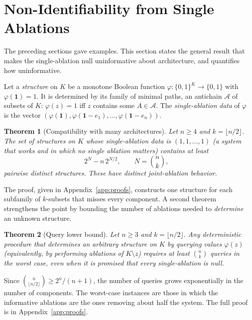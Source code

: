 \documentclass[11pt]{article}
\newtheorem{theorem}{Theorem}[section]
\theoremstyle{definition}
\theoremstyle{remark}
\begin{document}
\section{Non-Identifiability from Single Ablations}\label{sec:ident}

The preceding sections gave examples. This section states the general result that makes the single-ablation null uninformative about architecture, and quantifies how uninformative.

Let a \emph{structure} on $K$ be a monotone Boolean function $\varphi:\{0,1\}^K\to\{0,1\}$ with $\varphi(\mathbf 1)=1$. It is determined by its family of minimal paths, an antichain $\mathcal A$ of subsets of $K$: $\varphi(z)=1$ iff $z$ contains some $A\in\mathcal A$. The \emph{single-ablation data} of $\varphi$ is the vector $(\varphi(\mathbf 1),\varphi(\mathbf 1-e_1),\dots,\varphi(\mathbf 1-e_n))$.

\begin{theorem}[Compatibility with many architectures]\label{thm:many}
Let $n\ge 4$ and $k=\lfloor n/2\rfloor$. The set of structures on $K$ whose single-ablation data is $(1,1,\dots,1)$ (a system that works and in which no single ablation matters) contains at least
\[
2^{N}-n\,2^{N/2},\qquad N=\binom{n}{k},
\]
pairwise distinct structures. These have distinct joint-ablation behavior.
\end{theorem}

The proof, given in Appendix~\ref{app:proofs}, constructs one structure for each subfamily of $k$-subsets that misses every component. A second theorem strengthens the point by bounding the number of ablations needed to \emph{determine} an unknown structure.

\begin{theorem}[Query lower bound]\label{thm:query}
Let $n\ge 3$ and $k=\lfloor n/2\rfloor$. Any deterministic procedure that determines an arbitrary structure on $K$ by querying values $\varphi(z)$ (equivalently, by performing ablations of $K\setminus z$) requires at least $\binom{n}{k}$ queries in the worst case, even when it is promised that every single-ablation is null.
\end{theorem}

Since $\binom{n}{\lfloor n/2\rfloor}\ge 2^n/(n+1)$, the number of queries grows exponentially in the number of components. The worst-case instances are those in which the informative ablations are the ones removing about half the system. The full proof is in Appendix~\ref{app:proofs}.
\end{document}
